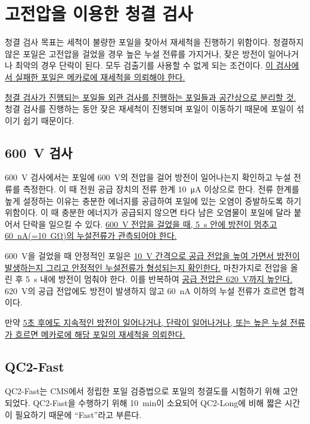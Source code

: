 \section{고전압을 이용한 청결 검사}
청결 검사 목표는 세척이 불량한 포일을 찾아서 재세척을 진행하기 위함이다. 청결하지 않은 포일은 고전압을 걸었을 경우 높은 누설 전류를 가지거나, 잦은 방전이 일어나거나 최악의 경우 단락이 된다. 모두 검출기를 사용할 수 없게 되는 조건이다. \uline{이 검사에서 실패한 포일은 메카로에 재세척을 의뢰해야 한다.}

\uline{청결 검사가 진행되는 포일들 외관 검사를 진행하는 포일들과 공간상으로 분리할 것.} 청결 검사를 진행하는 동안 잦은 재세척이 진행되며 포일이 이동하기 때문에 포일이 섞이기 쉽기 때문이다.

\subsection{\SI{600}{\volt} 검사}
\SI{600}{\volt} 검사에서는 포일에 \SI{600}{\volt}의 전압을 걸어 방전이 일어나는지 확인하고 누설 전류를 측정한다. 이 때 전원 공급 장치의 전류 한계 \SI{10}{\micro\ampere} 이상으로 한다. 전류 한계를 높게 설정하는 이유는 충분한 에너지를 공급하여 포일에 있는 오염이 증발하도록 하기 위함이다. 이 때 충분한 에너지가 공급되지 않으면 타다 남은 오염물이 포일에 달라 붙어서 단락을 일으킬 수 있다. \uline{\mbox{\SI{600}{\volt}} 전압을 걸었을 때, \mbox{\SI{5}{\second}} 안에 방전이 멈추고 \mbox{\SI{60}{\nano\ampere}}(=\mbox{\SI{10}{\giga\ohm}})의 누설전류가 관측되어야 한다.}

\SI{600}{\volt}을 걸었을 때 안정적인 포일은 \uline{\mbox{\SI{10}{\volt}} 간격으로 공급 전압을 높여 가면서 방전이 발생하는지 그리고 안정적인 누설전류가 형성되는지 확인한다.} 마찬가지로 전압을 올린 후 \SI{5}{\second} 내에 방전이 멈춰야 한다. 이를 반복하여 \uline{공급 전압은 \mbox{\SI{620}{\volt}}까지 높인다.} \SI{620}{\volt}의 공급 전압에도 방전이 발생하지 않고 \SI{60}{\nano\ampere} 이하의 누설 전류가 흐르면 합격이다.

만약 \uline{5초 후에도 지속적인 방전이 일어나거나, 단락이 일어나거나, 또는 높은 누설 전류가 흐르면 메카로에 해당 포일의 재세척을 의뢰한다.}

\subsection{QC2-Fast}
QC2-Fast는 CMS에서 정립한 포일 검증법으로 포일의 청결도를 시험하기 위해 고안되었다. QC2-Fast을 수행하기 위해 \SI{10}{\minute}이 소요되어 QC2-Long에 비해 짧은 시간이 필요하기 때문에 ``Fast''라고 부른다.

